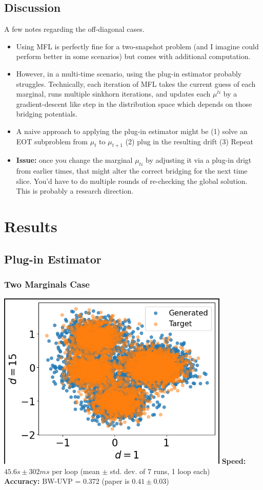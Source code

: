 \documentclass{article}
\begin{document}
\subsection{Discussion}
A few notes regarding the off-diagonal cases. 
\begin{itemize}
\item Using MFL is perfectly fine for a two-snapshot problem (and I imagine could perform better in some scenarios) but comes with additional computation. 
\item However, in a multi-time scenario, using the plug-in estimator probably struggles. Technically, each iteration of MFL takes the current guess of each marginal, runs multiple sinkhorn iterations, and updates each $\mu^{ti}$ by a gradient-descent like step in the distribution space which depends on those bridging potentials. 
\item  A naive approach to applying the plug-in estimator might be (1) solve an EOT subproblem from $\mu_t$ to $\mu_{t+1}$ (2) plug in the resulting drift (3) Repeat
\item \textbf{Issue:} once you change the marginal $\mu_{ti}$ by adjusting it via a plug-in drigt from earlier times, that might alter the correct bridging for the next time slice. You'd have to do multiple rounds of re-checking the global solution. This is probably a research direction.
    
\end{itemize}

\section{Results }
\subsection{Plug-in Estimator}
\subsubsection{Two Marginals Case}
\includegraphics[width=\textwidth, height=0.4\textheight]{Smooth Schrodinger Bridges/benchmark-results/PluginEstimatorNative.png}
\textbf{Speed:} $45.6 s \pm302ms$ per loop (mean $\pm $ std. dev. of 7 runs, 1 loop each)\\
\textbf{Accuracy:} BW-UVP = 0.372 (paper is $0.41\pm0.03$)
\end{document}

